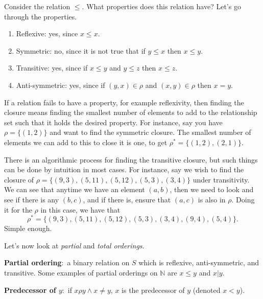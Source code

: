 \documentclass[nobib]{tufte-handout}
\newcommand{\defn}[2]{\noindent\textbf{#1}:\ #2}
\begin{document}
Consider the relation $\leq$. What properties does this relation have? Let's 
go through the properties. 
\begin{enumerate}
    \item Reflexive: yes, since $x \leq x$. 
    \item Symmetric: no, since it is not true that if $y \leq x$ then $x \leq y$. 
    \item Transitive: yes, since if $x \leq y$ and $y \leq z$ then $x \leq z$. 
    \item Anti-symmetric: yes, since if $(y,x) \in \rho$ and $(x,y) \in \rho$ then $x=y$. 
\end{enumerate}

If a relation fails to have a property, for example reflexivity, then 
finding the closure means finding the smallest number of elements to 
add to the relationship set such that it holds the desired property. 
For instance, say you have $\rho = \{(1,2)\}$ and want to find the symmetric 
closure. The smallest number of elements we can add to this to close it 
is one, to get $\rho^* = \{(1,2), (2,1)\}$.

There is an algorithmic process for finding the transitive closure, but such things can 
be done by intuition in most cases. For instance, say we wish to find the closure 
of $\rho = \{(9,3), (5, 11), (5, 12), (5, 3), (3, 4)\}$ under transitivity. 
We can see that anytime we have an element $(a,b)$, then we need to 
look and see if there is any $(b,c)$, and if there is, ensure that $(a,c)$ 
is also in $\rho$. Doing it for the $\rho$ in this case, we have that 
\[\rho^* = \{(9,3), (5, 11), (5, 12), (5, 3), (3, 4), (9,4), (5,4)\}.\]
Simple enough.

Let's now look at \emph{partial} and \emph{total orderings}. 

\defn{Partial ordering}{a binary relation on $S$ which 
is reflexive, anti-symmetric, and transitive}. Some examples 
of partial orderings on $\mathbb{N}$ are $x \leq y$ and $x|y$. 

\defn{Predecessor of $y$}{if $x\rho y \land x \neq y$, $x$ is the 
predecessor of $y$ (denoted $x<y$)}.
\end{document}
